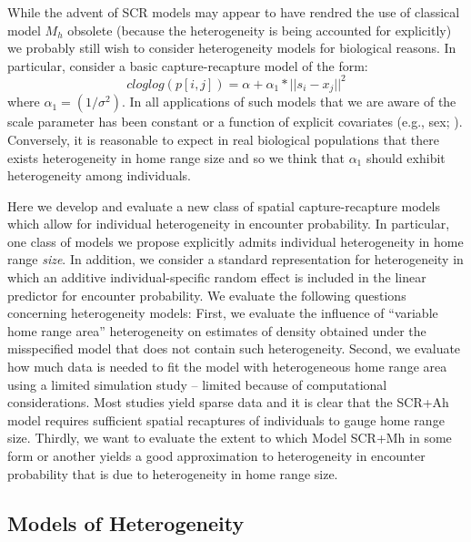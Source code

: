While the advent of SCR models may appear to have rendred the use of
classical model $M_h$ obsolete (because the heterogeneity is being
accounted for explicitly) we probably still wish to consider
heterogeneity models for biological reasons.
In particular, consider a basic capture-recapture model of the form:
\[
 cloglog(p[i,j]) = \alpha + \alpha_1*||s_{i} - x_{j}||^2
\]
where $\alpha_{1} = (1/\sigma^{2})$.  
In all applications of such models that we are aware of the scale
parameter has been constant or a function of explicit covariates
(e.g., sex; \citet{gardner_etal:2010}). Conversely, it is reasonable
to expect in real biological populations that there exists
heterogeneity in home range size and so we think that $\alpha_{1}$
should exhibit heterogeneity among individuals. 

Here we develop and evaluate a new class of spatial capture-recapture
models which allow for individual heterogeneity in encounter
probability.  In particular, one class of models we propose explicitly
admits individual heterogeneity in home range {\it size}. In addition,
we consider a standard representation for heterogeneity in which an
additive individual-specific random effect is included in the linear
predictor for encounter probability.  We evaluate the following
questions concerning heterogeneity models: First, we evaluate the
influence of ``variable home range area'' heterogeneity on estimates
of density obtained under the misspecified model that does not contain
such heterogeneity.  Second, we evaluate how much data is needed to
fit the model with heterogeneous home range area using a limited
simulation study -- limited because of computational considerations.
Most studies yield sparse data and it is clear that the SCR+Ah model
requires sufficient spatial recaptures of individuals to gauge home
range size.  Thirdly, we want to evaluate the extent to which Model
SCR+Mh in some form or another yields a good approximation to
heterogeneity in encounter probability that is due to heterogeneity in
home range size.

\subsection{Models of Heterogeneity}

